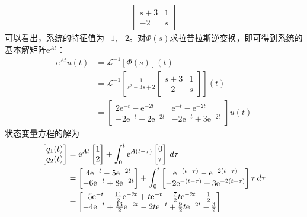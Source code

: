 \begin{example}
\begin{align*}
\begin{bmatrix}
            s+3 & 1\\
            -2 & s
        \end{bmatrix}
    \end{align*}
    可以看出，系统的特征值为$-1,-2$。对$\Phi(s)$求拉普拉斯逆变换，即可得到系统的基本解矩阵$\mathrm{e}^{At}$：\begin{align*}
        \mathrm{e}^{At}u(t)&=\mathcal{L} ^{-1} \left[\Phi(s)\right](t)\\
        &=\mathcal{L} ^{-1} \left[\frac{1}{s^2+3s+2}\begin{bmatrix}
            s+3 & 1\\
            -2 & s
        \end{bmatrix}\right](t)\\
        &=\begin{bmatrix}
            2\mathrm{e}^{-t}-\mathrm{e}^{-2t} & \mathrm{e}^{-t}-\mathrm{e}^{-2t}\\
            -2\mathrm{e}^{-t}+2\mathrm{e}^{-2t} & -2\mathrm{e}^{-t}+3\mathrm{e}^{-2t}
        \end{bmatrix}u(t)
    \end{align*}
    状态变量方程的解为\begin{align*}
        \begin{bmatrix}
            q_1(t)\\
            q_2(t)
        \end{bmatrix}&=\mathrm{e}^{At}\begin{bmatrix}
            1\\
            2
        \end{bmatrix}+\int_0^{t}\mathrm{e}^{A(t-\tau)}\begin{bmatrix}
            0\\
            \tau
        \end{bmatrix}\,d\tau\\
        &=\begin{bmatrix}
            4\mathrm{e}^{-t}-5\mathrm{e}^{-2t}\\
            -6\mathrm{e}^{-t}+8\mathrm{e}^{-2t}
        \end{bmatrix}+\int_0^{t}\begin{bmatrix}
            \mathrm{e}^{-(t-\tau)}-\mathrm{e}^{-2(t-\tau)}\\
            -2\mathrm{e}^{-(t-\tau)}+3\mathrm{e}^{-2(t-\tau)}
        \end{bmatrix}\tau\,d\tau\\
        &=\begin{bmatrix}
            5\mathrm{e}^{-t}-\frac{11}{2}\mathrm{e}^{-2t}+t\mathrm{e}^{-t}-\frac{7}{2}t\mathrm{e}^{-2t}-\frac{1}{2}\\
            -4\mathrm{e}^{-t}+\frac{13}{2}\mathrm{e}^{-2t}-2t\mathrm{e}^{-t}+\frac{9}{2}t\mathrm{e}^{-2t}-\frac{3}{2}
        \end{bmatrix}
    \end{align*}
\end{example}

